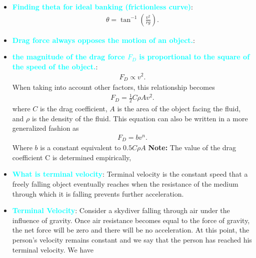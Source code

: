 \documentclass{report}
\begin{document}
\begin{itemize}
                \item \textbf{\textcolor{cyan}{Finding theta for ideal banking (frictionless curve)}}:
                    \begin{align*}
                        \theta = \tan^{-1}{\left(\frac{v^{2}}{rg}\right)}
                    .\end{align*}
                \item \textbf{\textcolor{cyan}{Drag force always opposes the motion of an object.}}:
                \item \textbf{\textcolor{cyan}{the magnitude of the drag force $F_{D}$ is proportional to the square of the speed of the object.}}:
                    \begin{align*}
                        F_{D} \propto v^{2}
                    .\end{align*}
                     When taking into account other factors, this relationship becomes
                     \begin{align*}
                         F_{D} = \frac{1}{2}C\rho Av^{2}
                     .\end{align*}
                     where $C$ is the drag coefficient, $A$ is the area of the object facing the fluid, and $\rho$ is the density of the fluid.
                     \bigbreak \noindent 
                     This equation can also be written in a more generalized fashion as
                     \begin{align*}
                         F_{D} = bv^{n}
                     .\end{align*}
                     Where $b$ is a constant equivalent to $0.5C\rho A$
                     \bigbreak \noindent 
                     \textbf{Note:} The value of the drag coefficient C is determined empirically,
                \item \textbf{\textcolor{cyan}{What is terminal velocity}}: Terminal velocity is the constant speed that a freely falling object eventually reaches when the resistance of the medium through which it is falling prevents further acceleration.
                \item \textbf{\textcolor{cyan}{Terminal Velocity}}: Consider a skydiver falling through air under the influence of gravity. Once air resistance becomes equal to the force of gravity, the net force will be zero and there will be no acceleration. At this point, the person’s velocity remains constant and we say that the person has reached his terminal velocity. We have
                    \begin{align*}

\end{align*}
\end{itemize}
\end{document}
